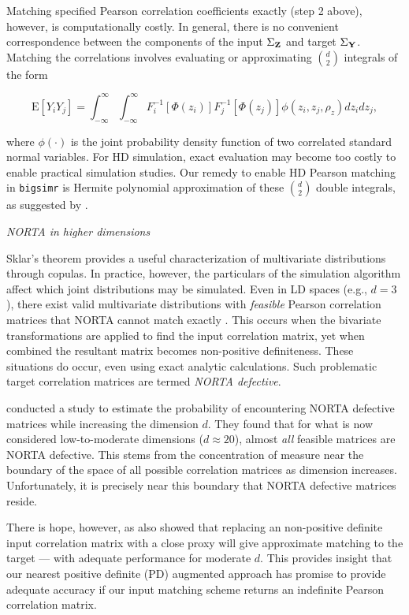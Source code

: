 \documentclass[
]{jss}
\begin{document}
Matching specified Pearson correlation coefficients exactly (step 2 above), however, is computationally costly. In general, there is no convenient correspondence between the components of the input \(\Sigma_{\bf Z}\) and target \(\Sigma_{\bf Y}\). Matching the correlations involves evaluating or approximating \(\binom{d}{2}\) integrals of the form

\begin{equation}
    \mathrm{E}\left[Y_i Y_j\right] = \int_{-\infty}^{\infty} \int_{-\infty}^{\infty} F_i^{-1}\left[\Phi(z_i)\right] F_j^{-1}\left[\Phi(z_j)\right] \phi(z_i, z_j, \rho_z) dz_i dz_j,
    \label{eq:pearsonIntegralRelation}
\end{equation}

where \(\phi(\cdot)\) is the joint probability density function of two correlated standard normal variables. For HD simulation, exact evaluation may become too costly to enable practical simulation studies. Our remedy to enable HD Pearson matching in \texttt{bigsimr} is Hermite polynomial approximation of these \(\binom{d}{2}\) double integrals, as suggested by \citet{XZ19}.

\emph{NORTA in higher dimensions}

Sklar's theorem provides a useful characterization of multivariate distributions through copulas. In practice, however, the particulars of the simulation algorithm affect which joint distributions may be simulated. Even in LD spaces (e.g., \(d=3\)), there exist valid multivariate distributions with \emph{feasible} Pearson correlation matrices that NORTA cannot match exactly \citep{LH75}. This occurs when the bivariate transformations are applied to find the input correlation matrix, yet when combined the resultant matrix becomes non-positive definiteness. These situations do occur, even using exact analytic calculations. Such problematic target correlation matrices are termed \emph{NORTA defective}.

\citet{GH02} conducted a study to estimate the probability of encountering NORTA defective matrices while increasing the dimension \(d\). They found that for what is now considered low-to-moderate dimensions (\(d \approx 20\)), almost \emph{all} feasible matrices are NORTA defective. This stems from the concentration of measure near the boundary of the space of all possible correlation matrices as dimension increases. Unfortunately, it is precisely near this boundary that NORTA defective matrices reside.

There is hope, however, as \citet{GH02} also showed that replacing an non-positive definite input correlation matrix with a close proxy will give approximate matching to the target --- with adequate performance for moderate \(d\). This provides insight that our nearest positive definite (PD) augmented approach has promise to provide adequate accuracy if our input matching scheme returns an indefinite Pearson correlation matrix.
\end{document}
